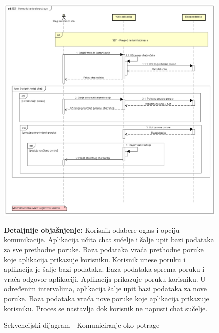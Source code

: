 \begin{figure}[hp!]
	\centering
	\includegraphics[width=\textwidth]{slike/SD5 - Komuniciranje oko potrage.png}
	\caption{Sekvencijski dijagram - Komuniciranje oko potrage}
	\begin{flushleft}
		\textbf{Detaljnije objašnjenje:}
		Korisnik odabere oglas i opciju komunikacije. Aplikacija učita chat sučelje i šalje upit bazi podataka za sve prethodne poruke. Baza podataka vraća prethodne poruke koje aplikacija prikazuje korisniku. Korisnik unese poruku i aplikacija je šalje bazi podataka. Baza podataka sprema poruku i vraća odgovor aplikaciji. Aplikacija prikazuje poruku korisniku. U određenim intervalima, aplikacija šalje upit bazi podataka za nove poruke. Baza podataka vraća nove poruke koje aplikacija prikazuje korisniku. Proces se nastavlja dok korisnik ne napusti chat sučelje.
	\end{flushleft}
\end{figure}
\pagebreak
